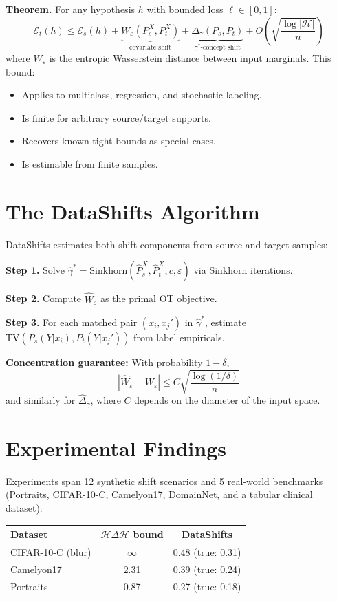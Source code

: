 \documentclass[10pt,twocolumn]{article}
\begin{document}
\textbf{Theorem.} For any hypothesis $h$ with bounded loss
$\ell \in [0,1]$:
\[
  \mathcal{E}_t(h) \leq \mathcal{E}_s(h)
    + \underbrace{W_\varepsilon(P_s^X, P_t^X)}_{\text{covariate shift}}
    + \underbrace{\Delta_\gamma(P_s, P_t)}_{\gamma^*\text{-concept shift}}
    + O\!\left(\sqrt{\frac{\log|\mathcal{H}|}{n}}\right)
\]
where $W_\varepsilon$ is the entropic Wasserstein distance between input
marginals. This bound:
\begin{itemize}[itemsep=2pt,topsep=2pt]
  \item Applies to multiclass, regression, and stochastic labeling.
  \item Is finite for arbitrary source/target supports.
  \item Recovers known tight bounds as special cases.
  \item Is estimable from finite samples.
\end{itemize}

\section{The DataShifts Algorithm}

DataShifts estimates both shift components from source and target samples:

\textbf{Step 1.} Solve $\hat{\gamma}^* = \mathrm{Sinkhorn}(\hat{P}_s^X,
\hat{P}_t^X, c, \varepsilon)$ via Sinkhorn iterations.

\textbf{Step 2.} Compute $\hat{W}_\varepsilon$ as the primal OT objective.

\textbf{Step 3.} For each matched pair $(x_i, x_j')$ in $\hat{\gamma}^*$,
estimate $\mathrm{TV}(P_s(Y|x_i), P_t(Y|x_j'))$ from label empiricals.

\textbf{Concentration guarantee:} With probability $1 - \delta$,
\[
  |\hat{W}_\varepsilon - W_\varepsilon| \leq C\sqrt{\frac{\log(1/\delta)}{n}}
\]
and similarly for $\hat{\Delta}_\gamma$, where $C$ depends on the
diameter of the input space.

\section{Experimental Findings}

Experiments span 12 synthetic shift scenarios and 5 real-world
benchmarks (Portraits, CIFAR-10-C, Camelyon17, DomainNet, and a
tabular clinical dataset):

\begin{center}
\begin{tabular}{lcc}
\toprule
Dataset & $\mathcal{H}\Delta\mathcal{H}$ bound & DataShifts \\
\midrule
CIFAR-10-C (blur)  & $\infty$ & 0.48 (true: 0.31) \\
Camelyon17         & 2.31     & 0.39 (true: 0.24) \\
Portraits          & 0.87     & 0.27 (true: 0.18) \\
\bottomrule
\end{tabular}
\end{center}
\end{document}
